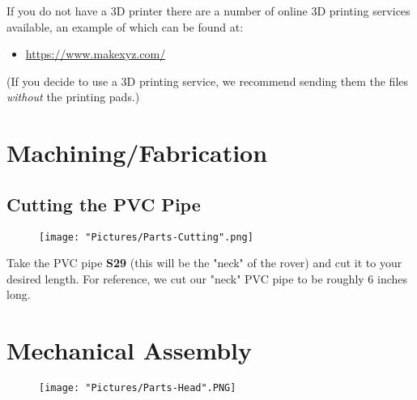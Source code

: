 \documentclass[12pt]{article}
\begin{document}
If you do not have a 3D printer there are a number of online 3D printing services available, an example of which can be found at:

\begin{itemize}
	\item \href{https://www.makexyz.com/}{https://www.makexyz.com/}
\end{itemize}

(If you decide to use a 3D printing service, we recommend sending them the files \textit{without} the printing pads.)

\section{Machining/Fabrication}
\subsection{Cutting the PVC Pipe}

\begin{figure}[H]
	\centering
	\texttt{[image: "Pictures/Parts-Cutting".png]}
\end{figure}


Take the PVC pipe \textbf{S29} (this will be the "neck" of the rover) and cut it to your desired length. For reference, we cut our "neck" PVC pipe to be roughly 6 inches long.


\section{Mechanical Assembly}

\begin{figure}[H]
	\centering
	\texttt{[image: "Pictures/Parts-Head".PNG]}
\end{figure}
\end{document}
